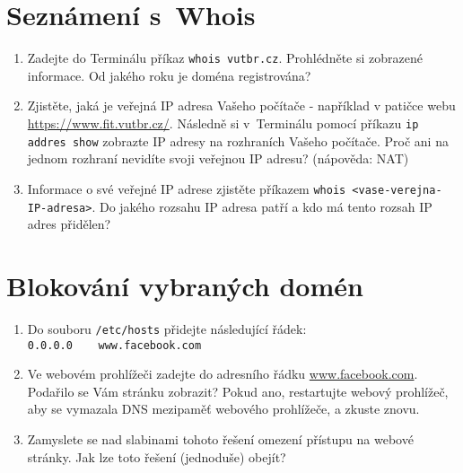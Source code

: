 \section{Seznámení s~Whois}
\begin{enumerate}
    \item Zadejte do Terminálu příkaz \texttt{whois vutbr.cz}. Prohlédněte si zobrazené informace. Od jakého roku je doména registrována?
    \item Zjistěte, jaká je veřejná IP adresa Vašeho počítače - například v patičce webu \url{https://www.fit.vutbr.cz/}. Následně si v~Terminálu pomocí příkazu \texttt{ip addres show} zobrazte IP adresy na rozhraních Vašeho počítače. Proč ani na jednom rozhraní nevidíte svoji veřejnou IP adresu? (nápověda: NAT)
    \item Informace o své veřejné IP adrese zjistěte příkazem \texttt{whois <vase-verejna-IP-adresa>}. Do jakého rozsahu IP adresa patří a kdo má tento rozsah IP adres přidělen?
\end{enumerate}

\section{Blokování vybraných domén}
\begin{enumerate}
	\item Do souboru \texttt{/etc/hosts} přidejte následující řádek:\\
    \verb|0.0.0.0    www.facebook.com|
    \item Ve webovém prohlížeči zadejte do adresního řádku \url{www.facebook.com}. Podařilo se Vám stránku zobrazit? Pokud ano, restartujte webový prohlížeč, aby se vymazala DNS mezipaměť webového prohlížeče, a zkuste znovu.
    \item Zamyslete se nad slabinami tohoto řešení omezení přístupu na webové stránky. Jak lze toto řešení (jednoduše) obejít?
\end{enumerate}

